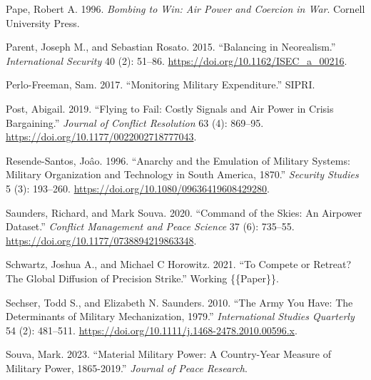 \documentclass[
]{article}
\newlength{\cslhangindent}
\newlength{\cslentryspacingunit} %
\newenvironment{CSLReferences}[2] %
 {%
  \setlength{\parindent}{0pt}
  \ifodd #1
  \let\oldpar\par
  \def\par{\hangindent=\cslhangindent\oldpar}
  \fi
  \setlength{\parskip}{#2\cslentryspacingunit}
 }%
 {}
\begin{document}
\begin{CSLReferences}{1}{0}
\leavevmode{}%
Pape, Robert A. 1996. \emph{Bombing to {Win}: {Air Power} and {Coercion} in {War}}. {Cornell University Press}.

\leavevmode{}%
Parent, Joseph M., and Sebastian Rosato. 2015. {``Balancing in {Neorealism}.''} \emph{International Security} 40 (2): 51--86. \url{https://doi.org/10.1162/ISEC_a_00216}.

\leavevmode{}%
Perlo-Freeman, Sam. 2017. {``Monitoring Military Expenditure.''} {SIPRI}.

\leavevmode{}%
Post, Abigail. 2019. {``Flying to {Fail}: {Costly Signals} and {Air Power} in {Crisis Bargaining}.''} \emph{Journal of Conflict Resolution} 63 (4): 869--95. \url{https://doi.org/10.1177/0022002718777043}.

\leavevmode{}%
Resende-Santos, Joâo. 1996. {``Anarchy and the Emulation of Military Systems: {Military} Organization and Technology in {South America}, 1870.''} \emph{Security Studies} 5 (3): 193--260. \url{https://doi.org/10.1080/09636419608429280}.

\leavevmode{}%
Saunders, Richard, and Mark Souva. 2020. {``Command of the {Skies}: {An Airpower Dataset}.''} \emph{Conflict Management and Peace Science} 37 (6): 735--55. \url{https://doi.org/10.1177/0738894219863348}.

\leavevmode{}%
Schwartz, Joshua A., and Michael C Horowitz. 2021. {``To {Compete} or {Retreat}? {The Global Diffusion} of {Precision Strike}.''} Working \{\{Paper\}\}.

\leavevmode{}%
Sechser, Todd S., and Elizabeth N. Saunders. 2010. {``The {Army You Have}: {The Determinants} of {Military Mechanization}, 1979.''} \emph{International Studies Quarterly} 54 (2): 481--511. \url{https://doi.org/10.1111/j.1468-2478.2010.00596.x}.

\leavevmode{}%
Souva, Mark. 2023. {``Material {Military Power}: {A Country-Year Measure} of {Military Power}, 1865-2019.''} \emph{Journal of Peace Research}.


\end{CSLReferences}
\end{document}
